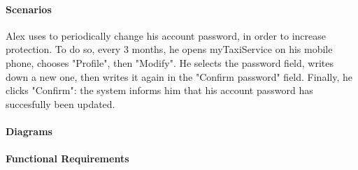 \paragraph{Scenarios}
Alex uses to periodically change his account password, in order to increase protection. To do so, every 3 months, he opens myTaxiService on his mobile phone, chooses "Profile", then "Modify". He selects the password field, writes down a new one, then writes it again in the "Confirm password" field. Finally, he clicks "Confirm": the system informs him that his account password has succesfully been updated.

\paragraph{Diagrams}

\paragraph{Functional Requirements}
